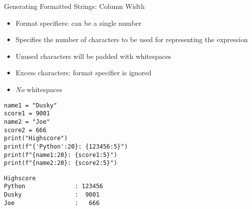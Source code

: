 \begin{frame}[fragile]{Generating Formatted Strings: Column Width}
%
\begin{itemize}
\item Format specifiers: can be a single number
\item Specifies the number of characters to be used for representing the expression
\item Unused characters will be padded with whitespaces
\item Excess characters: format specifier is ignored
\item \emph{No} whitespaces
\end{itemize}

\begin{codebox}[Code: Format Strings (2), width=.49\linewidth, nobeforeafter, equal height group = grpFormatString2]
\begin{verbatim}
name1 = "Dusky"
score1 = 9001
name2 = "Joe"
score2 = 666
print("Highscore")
print(f"{'Python':20}: {123456:5}")
print(f"{name1:20}: {score1:5}")
print(f"{name2:20}: {score2:5}")
\end{verbatim}
\end{codebox}
%
\begin{cmdbox}[Output: Format Strings (2), width=.49\linewidth, nobeforeafter, equal height group = grpFormatString2]
\begin{verbatim}
Highscore
Python              : 123456
Dusky               :  9001
Joe                 :   666
\end{verbatim}
\end{cmdbox}
%
\end{frame}


